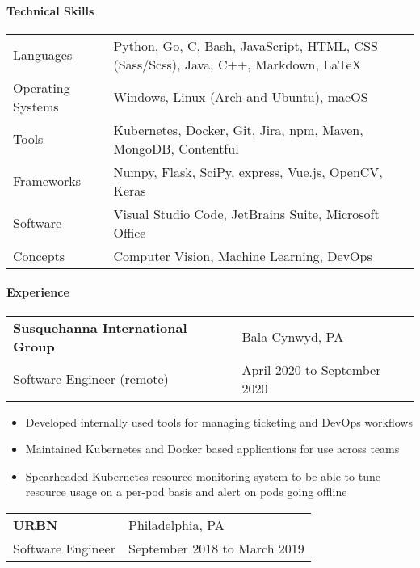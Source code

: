 \documentclass[9pt,]{article}
\let\oldparagraph\paragraph
\renewcommand{\paragraph}[1]{\oldparagraph{#1}\mbox{}}
\begin{document}
\hypertarget{technical-skills}{%
\paragraph{Technical Skills}\label{technical-skills}}

\begin{tabular}{l | l}
    Languages & Python, Go, C, Bash, JavaScript, HTML, CSS (Sass/Scss), Java, C++, Markdown, \LaTeX\\
    Operating Systems     & Windows, Linux (Arch and Ubuntu), macOS\\
    Tools             & Kubernetes, Docker, Git, Jira, npm, Maven, MongoDB, Contentful\\
    Frameworks        & Numpy, Flask, SciPy, express, Vue.js, OpenCV, Keras\\
    Software          & Visual Studio Code, JetBrains Suite, Microsoft Office\\
    Concepts & Computer Vision, Machine Learning, DevOps\\
\end{tabular}
\vspace{-3mm}


\hypertarget{experience}{%
\paragraph{Experience}\label{experience}}

\begin{tabularx}{\textwidth}{l X}
    \textbf{Susquehanna International Group} & \hfill Bala Cynwyd, PA \\
    Software Engineer (remote)       & \hfill April 2020 to September 2020
\end{tabularx}

\begin{itemize}
	\setlength\itemsep{-0.75em}
    \item Developed internally used tools for managing ticketing and DevOps workflows
    \item Maintained Kubernetes and Docker based applications for use across teams
    \item Spearheaded Kubernetes resource monitoring system to be able to tune resource usage on a per-pod basis and alert on pods going offline
\end{itemize}

\begin{tabularx}{\textwidth}{l X}
    \textbf{URBN} & \hfill Philadelphia, PA\\
    Software Engineer        & \hfill September 2018 to March 2019
\end{tabularx}
\end{document}
